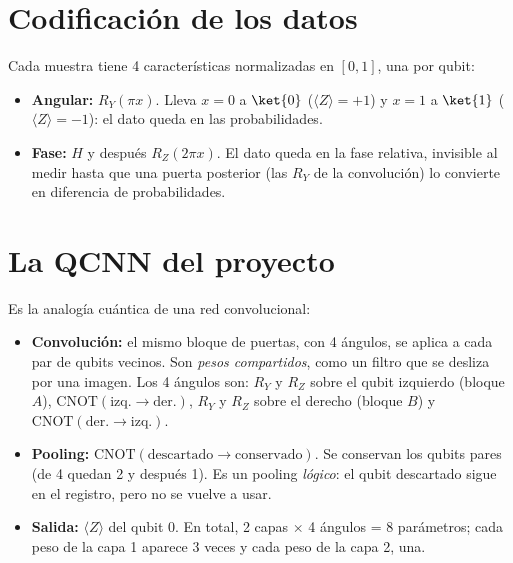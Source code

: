 \documentclass[11pt,a4paper]{article}
\begin{document}
\section{Codificación de los datos}

Cada muestra tiene 4 características normalizadas en $[0,1]$, una por qubit:
\begin{itemize}
  \item \textbf{Angular:} $R_Y(\pi x)$. Lleva $x=0$ a $\ket{0}$ ($\langle Z\rangle=+1$) y $x=1$ a $\ket{1}$
        ($\langle Z\rangle=-1$): el dato queda en las probabilidades.
  \item \textbf{Fase:} $H$ y después $R_Z(2\pi x)$. El dato queda en la fase relativa, invisible al medir hasta que una
        puerta posterior (las $R_Y$ de la convolución) lo convierte en diferencia de probabilidades.
\end{itemize}

\section{La QCNN del proyecto}

Es la analogía cuántica de una red convolucional:
\begin{itemize}
  \item \textbf{Convolución:} el mismo bloque de puertas, con 4 ángulos, se aplica a cada par de qubits vecinos. Son
        \emph{pesos compartidos}, como un filtro que se desliza por una imagen. Los 4 ángulos son: $R_Y$ y $R_Z$
        sobre el qubit izquierdo (bloque $A$), $\mathrm{CNOT}(\text{izq.}\to\text{der.})$, $R_Y$ y $R_Z$ sobre el
        derecho (bloque $B$) y $\mathrm{CNOT}(\text{der.}\to\text{izq.})$.
  \item \textbf{Pooling:} $\mathrm{CNOT}(\text{descartado}\to\text{conservado})$. Se conservan los qubits pares (de 4
        quedan 2 y después 1). Es un pooling \emph{lógico}: el qubit descartado sigue en el registro, pero no se vuelve a usar.
  \item \textbf{Salida:} $\langle Z\rangle$ del qubit 0. En total, 2 capas $\times$ 4 ángulos = 8 parámetros; cada
        peso de la capa 1 aparece 3 veces y cada peso de la capa 2, una.
\end{itemize}
\end{document}
